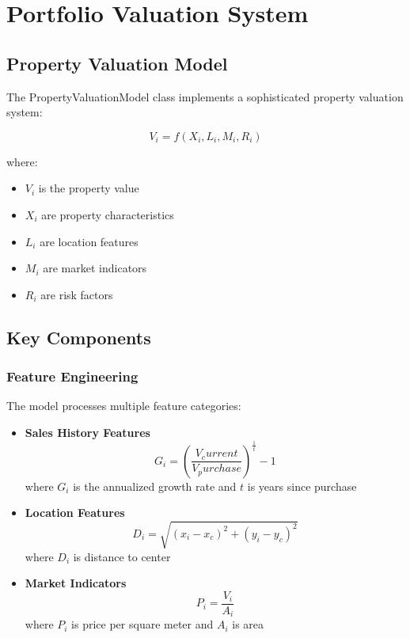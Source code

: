 \documentclass{article}
\begin{document}
\section{Portfolio Valuation System}

\subsection{Property Valuation Model}
The PropertyValuationModel class implements a sophisticated property valuation system:

\begin{equation}
V_i = f(X_i, L_i, M_i, R_i)
\end{equation}

where:
\begin{itemize}
    \item $V_i$ is the property value
    \item $X_i$ are property characteristics
    \item $L_i$ are location features
    \item $M_i$ are market indicators
    \item $R_i$ are risk factors
\end{itemize}

\subsection{Key Components}

\subsubsection{Feature Engineering}
The model processes multiple feature categories:

\begin{itemize}
    \item \textbf{Sales History Features}
    \begin{equation}
    G_i = (\frac{V_current}{V_purchase})^{\frac{1}{t}} - 1
    \end{equation}
    where $G_i$ is the annualized growth rate and $t$ is years since purchase

    \item \textbf{Location Features}
    \begin{equation}
    D_i = \sqrt{(x_i - x_c)^2 + (y_i - y_c)^2}
    \end{equation}
    where $D_i$ is distance to center

    \item \textbf{Market Indicators}
    \begin{equation}
    P_i = \frac{V_i}{A_i}
    \end{equation}
    where $P_i$ is price per square meter and $A_i$ is area
\end{itemize}
\end{document}
